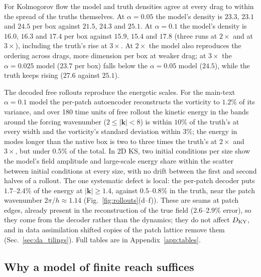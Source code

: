 For Kolmogorov flow the model and truth densities agree at every drag to
within the spread of the truths themselves. At $\alpha=0.05$ the model's
density is $23.3$, $23.1$ and $24.5$ per box against $21.5$, $24.3$ and
$25.1$. At $\alpha=0.1$ the model's density is $16.0$, $16.3$ and $17.4$ per box
against $15.9$, $15.4$ and $17.8$ (three runs at $2\times$ and at
$3\times$), including the truth's rise at $3\times$. At $2\times$ the model also reproduces the ordering across drags,
more dimension per box at weaker drag; at $3\times$ the $\alpha=0.025$ model
($23.7$ per box) falls below the $\alpha=0.05$ model ($24.5$), while the
truth keeps rising ($27.6$ against $25.1$).

 The decoded free rollouts reproduce the
energetic scales. For the main-text $\alpha=0.1$ model the per-patch
autoencoder reconstructs the vorticity to $1.2\%$ of its variance, and
over 180 time units of free rollout the kinetic energy in the bands
around the forcing wavenumber ($2\le|\bm k|<8$) is within $10\%$ of the
truth's at every width and the vorticity's standard deviation within
$3\%$; the energy in modes longer than the native box is two to three
times the truth's at $2\times$ and $3\times$, but under $0.5\%$ of the
total. In 2D KS,
two initial conditions per size show the model's field amplitude and
large-scale energy share within the scatter between initial conditions
at every size, with no drift between the first and second halves of a
rollout. The one systematic defect is local: the per-patch decoder puts
$1.7$--$2.4\%$ of the energy at $|\bm k|\ge1.4$, against $0.5$--$0.8\%$ in
the truth, near the patch wavenumber $2\pi/h\approx1.14$
(Fig.~\ref{fig:rollouts}(d--f)). These are seams at patch edges, already present in the reconstruction of the true
field ($2.6$--$2.9\%$ error), so they come from the decoder rather than
the dynamics; they do not affect $D_{\mathrm{KY}}$, and in data assimilation shifted
copies of the patch lattice remove them (Sec.~\ref{sec:da_tilings}). Full tables are in Appendix~\ref{app:tables}.

\subsection{Why a model of finite reach suffices}
\label{sec:chaos_scale}


